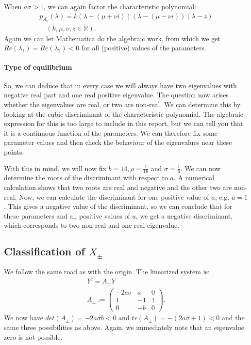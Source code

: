 When $a\sigma > 1$, we can again factor the characteristic polynomial:
\begin{gather*}
  \label{eq:origin-cp-factor}
  p_{A_0}(\lambda) = k(\lambda - (\mu + \nu i))(\lambda - (\mu - \nu
  i))(\lambda - z) \\
  \quad (k,\mu,\nu,z \in \mathbb{R}).
\end{gather*}
Again we can let Mathematica do the algebraic work, from which we get
$Re(\lambda_1) = Re(\lambda_2) < 0$ for all (positive) values of the
parameters.

\paragraph{Type of equilibrium}

So, we can deduce that in every case we will always have two
eigenvalues with negative real part and one real positive eigenvalue.
The question now arises whether the eigenvalues are real, or two are
non-real.  We can determine this by looking at the cubic discriminant
of the characteristic polynomial.  The algebraic expression for this
is too large to include in this report, but we can tell you that it
is a continuous function of the parameters.  We can therefore fix some
parameter values and then check the behaviour of the eigenvalues near
these points.

With this in mind, we will now fix $b = 14, \rho = \frac{1}{16}$ and
$\sigma = \frac{1}{6}$.  We can now determine the roots of the
discriminant with respect to $a$.  A numerical calculation shows that
two roots are real and negative and the other two are non-real.  Now,
we can calculate the discriminant for one positive value of $a$,
e.g. $a = 1$.  This gives a negative value of the discriminant, so we
can conclude that for these parameters and all positive values of $a$,
we get a negative discriminant, which corresponds to two non-real and
one real eigenvalue.

\subsection{Classification of $X_\pm$}

We follow the same road as with the origin.  The linearized system is:
\begin{gather}
  \label{eq:linear_pm}
  Y' = A_\pm Y\\
  A_\pm :=
  \begin{pmatrix}
    -2 a \sigma & a & 0\\
    1 & -1 & 1\\
    0 & -b & 0
  \end{pmatrix}.
\end{gather}
We now have $det(A_\pm) = -2a \sigma b < 0$ and $tr(A_\pm) = -(2a\sigma +
1) < 0$ and the same three possibilities as above.  Again, we
immediately note that an eigenvalue zero is not possible.

